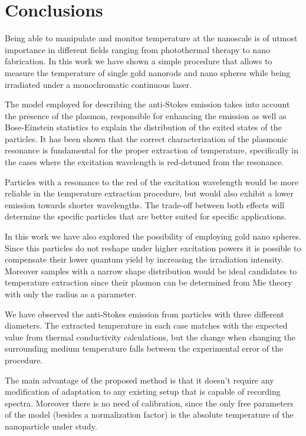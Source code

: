 \documentclass[journal=nalefd,manuscript=letter]{achemso}
\begin{document}
\section{Conclusions}
Being able to manipulate and monitor temperature at the nanoscale is of utmost
importance in different fields ranging from photothermal therapy to nano
fabrication. In this work we have shown a simple procedure that allows to
measure the temperature of single gold nanorods and nano spheres while being
irradiated under a monochromatic continuous laser. 

The model employed for describing the anti-Stokes emission takes into account
the presence of the plasmon, responsible for enhancing the emission as well as
Bose-Einstein statistics to explain the distribution of the exited states of the
particles. It has been shown that the correct characterization of the plasmonic
resonance is fundamental for the proper extraction of temperature, specifically
in the cases where the excitation wavelength is red-detuned from the resonance.

Particles with a resonance to the red of the excitation wavelength would be more
reliable in the temperature extraction procedure, but would also exhibit a lower
emission towards shorter wavelengths. The trade-off between both effects will
determine the specific particles that are better suited for specific
applications.

In this work we have also explored the possibility of employing gold nano
spheres. Since this particles do not reshape under higher excitation powers it
is possible to compensate their lower quantum yield by increasing the
irradiation intensity. Moreover samples with a narrow shape distribution would
be ideal candidates to temperature extraction since their plasmon can be
determined from Mie theory with only the radius as a parameter. 

We have observed the anti-Stokes emission from particles with three different
diameters. The extracted temperature in each case matches with the expected
value from thermal conductivity calculations, but the change when changing the
surrounding medium temperature falls between the experimental error of the
procedure.

The main advantage of the proposed method is that it doesn't require any
modification of adaptation to any existing setup that is capable of recording
spectra. Moreover there is no need of calibration, since the only free
parameters of the model (besides a normalization factor) is the absolute
temperature of the nanoparticle under study.
\end{document}
